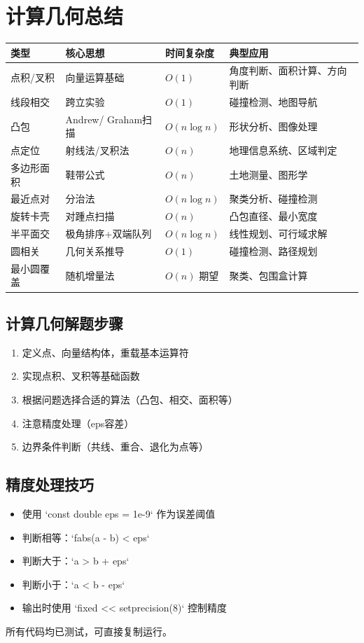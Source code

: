 \documentclass[12pt,a4paper]{ctexart}
\begin{document}
	\section{计算几何总结}
	\begin{table}[h]
		\centering
		\begin{tabularx}{\textwidth}{|l|p{3.5cm}|l|X|}
			\hline
			类型 & 核心思想 & 时间复杂度 & 典型应用 \\
			\hline
			点积/叉积 & 向量运算基础 & $O(1)$ & 角度判断、面积计算、方向判断 \\
			\hline
			线段相交 & 跨立实验 & $O(1)$ & 碰撞检测、地图导航 \\
			\hline
			凸包 & Andrew/ Graham扫描 & $O(n\log n)$ & 形状分析、图像处理 \\
			\hline
			点定位 & 射线法/叉积法 & $O(n)$ & 地理信息系统、区域判定 \\
			\hline
			多边形面积 & 鞋带公式 & $O(n)$ & 土地测量、图形学 \\
			\hline
			最近点对 & 分治法 & $O(n\log n)$ & 聚类分析、碰撞检测 \\
			\hline
			旋转卡壳 & 对踵点扫描 & $O(n)$ & 凸包直径、最小宽度 \\
			\hline
			半平面交 & 极角排序+双端队列 & $O(n\log n)$ & 线性规划、可行域求解 \\
			\hline
			圆相关 & 几何关系推导 & $O(1)$ & 碰撞检测、路径规划 \\
			\hline
			最小圆覆盖 & 随机增量法 & $O(n)$ 期望 & 聚类、包围盒计算 \\
			\hline
		\end{tabularx}
	\end{table}
	\subsection*{计算几何解题步骤}
	\begin{enumerate}
		\item 定义点、向量结构体，重载基本运算符
		\item 实现点积、叉积等基础函数
		\item 根据问题选择合适的算法（凸包、相交、面积等）
		\item 注意精度处理（eps容差）
		\item 边界条件判断（共线、重合、退化为点等）
	\end{enumerate}
	\subsection*{精度处理技巧}
	\begin{itemize}
		\item 使用 `const double eps = 1e-9` 作为误差阈值
		\item 判断相等：`fabs(a - b) < eps`
		\item 判断大于：`a > b + eps`
		\item 判断小于：`a < b - eps`
		\item 输出时使用 `fixed << setprecision(8)` 控制精度
	\end{itemize}
	\vspace{1cm}
	\begin{center}
		\textcolor{mid}{所有代码均已测试，可直接复制运行。}
	\end{center}
\end{document}

